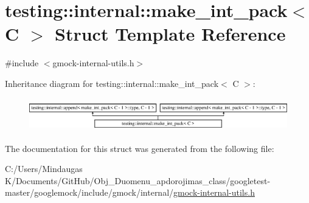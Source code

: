 \hypertarget{structtesting_1_1internal_1_1make__int__pack}{}\section{testing\+::internal\+::make\+\_\+int\+\_\+pack$<$ C $>$ Struct Template Reference}
\label{structtesting_1_1internal_1_1make__int__pack}


{\ttfamily \#include $<$gmock-\/internal-\/utils.\+h$>$}

Inheritance diagram for testing\+::internal\+::make\+\_\+int\+\_\+pack$<$ C $>$\+:\begin{figure}[H]
\begin{center}
\leavevmode
\includegraphics[height=1.443299cm]{d7/d40/structtesting_1_1internal_1_1make__int__pack}
\end{center}
\end{figure}


The documentation for this struct was generated from the following file\+:\begin{DoxyCompactItemize}
\item 
C\+:/\+Users/\+Mindaugas K/\+Documents/\+Git\+Hub/\+Obj\+\_\+\+Duomenu\+\_\+apdorojimas\+\_\+class/googletest-\/master/googlemock/include/gmock/internal/\mbox{\hyperlink{googletest-master_2googlemock_2include_2gmock_2internal_2gmock-internal-utils_8h}{gmock-\/internal-\/utils.\+h}}\end{DoxyCompactItemize}
